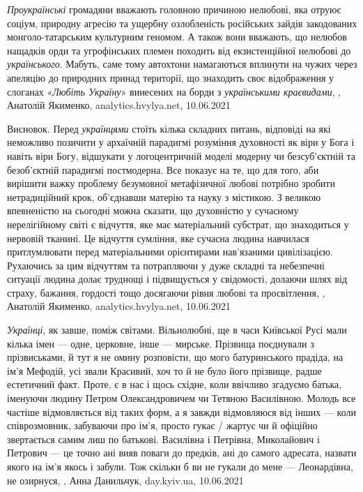 \emph{Проукраїнські} громадяни вважають головною причиною нелюбові, яка отруює соціум,
природну агресію та ущербну озлобленість російських зайдів закодованих
монголо-татарським культурним геномом. А також вони вважають, що нелюбов
нащадків орди та угрофінських племен походить від екзистенційної нелюбові до
\emph{українського}. Мабуть, саме тому автохтони намагаються вплинути на чужих через
апеляцію до природних принад території, що знаходить своє відображення у
слоганах «\emph{Любіть Україну}» винесених на борди з \emph{українськими краєвидами},
, Анатолій Якименко, analytics.hvylya.net, 10.06.2021

Висновок. Перед \emph{українцями} стоїть кілька складних питань, відповіді на які
неможливо позичити у архаїчній парадигмі розуміння духовності як віри у Бога і
навіть віри Богу, відшукати у логоцентричній моделі модерну чи безсуб'єктній та
безоб'єктній парадигмі постмодерна. Все показує на те, що для того, аби
вирішити важку проблему безумовної метафізичної любові потрібно зробити
нетрадиційний крок, об'єднавши матерію та науку з містикою. З великою
впевненістю на сьогодні можна сказати, що духовністю у сучасному нерелігійному
світі є відчуття, яке має матеріальний субстрат, що знаходиться у нервовій
тканині. Це відчуття сумління, яке сучасна людина навчилася притлумлювати перед
матеріальними орієнтирами нав'язаними цивілізацією. Рухаючись за цим відчуттям
та потрапляючи у дуже складні та небезпечні ситуації людина долає труднощі і
підвищується у свідомості, долаючи шлях від страху, бажання, гордості тощо
досягаючи рівня любові та просвітлення,
, Анатолій Якименко, analytics.hvylya.net, 10.06.2021

\emph{Українці}, як завше, поміж світами. Вільнолюбні, ще в часи Київської Русі мали
кілька імен — одне, церковне, інше — мирське. Прізвища поєднували з
прізвиськами, й тут я не омину розповісти, що мого батуринського прадіда, на
ім'я Мефодій, усі звали Красивий, хоч то й не було його прізвище, радше
естетичний факт. Проте, є в нас і щось східне, коли ввічливо згадуємо батька,
іменуючи людину Петром Олександровичем чи Тетяною Василівною. Молодь все
частіше відмовляється від таких форм, а я завжди відмовляюся від інших — коли
співрозмовник, забуваючи про ім'я, просто гукає / жартує  чи й офіційно
звертається самим лиш по батькові. Василівна і Петрівна, Миколайович і Петрович
— це точно ані вияв поваги до предків, ані до самого адресата, назвати якого на
ім'я якось і забули. Тож скільки б ви не гукали до мене — Леонардівна, не
озирнуся,
, Анна Данильчук, day.kyiv.ua, 10.06.2021

